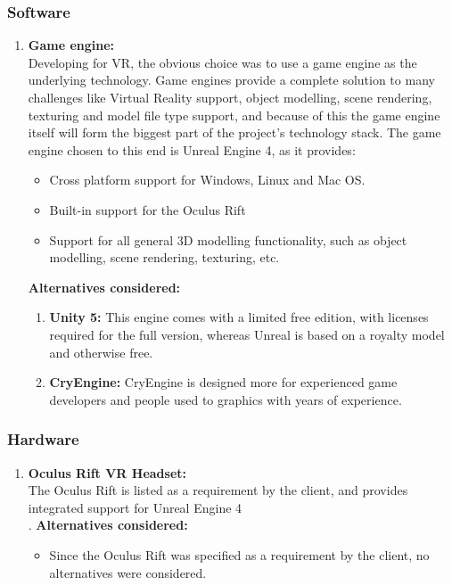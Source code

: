 \documentclass[a4paper,12pt]{article}
\begin{document}
\subsubsection{Software}
\begin{enumerate}
	\item \textbf{Game engine:}\\
		Developing for VR, the obvious choice was to use a game engine as the underlying technology. Game engines provide a complete solution to many challenges like Virtual Reality support, object modelling, scene rendering, texturing and model file type support, and because of this the game engine itself will form the biggest part of the project's technology stack. The game engine chosen to this end is Unreal Engine 4, as it provides:
		\begin{itemize}
			\item Cross platform support for Windows, Linux and Mac OS.
			\item Built-in support for the Oculus Rift
			\item Support for all general 3D modelling functionality, such as object modelling, scene rendering, texturing, etc.
		\end{itemize}
		\textbf{Alternatives considered:}
		\begin{enumerate}
			\item \textbf{Unity 5:}  This engine comes with a limited free edition, with licenses required for the full version, whereas Unreal is based on a royalty model and otherwise free.
			\item \textbf{CryEngine:} CryEngine is designed more for experienced game developers and people used to graphics with years of experience. %
		\end{enumerate}
\end{enumerate}
\subsubsection{Hardware}
\begin{enumerate}
	\item \textbf{Oculus Rift VR Headset:}\\
		The Oculus Rift is listed as a requirement by the client, and provides integrated support for Unreal Engine 4\\.
		\textbf{Alternatives considered:}
		\begin{itemize}
			\item Since the Oculus Rift was specified as a requirement by the client, no alternatives were considered.
		\end{itemize}
\end{enumerate}
\newpage
%
%
\end{document}
